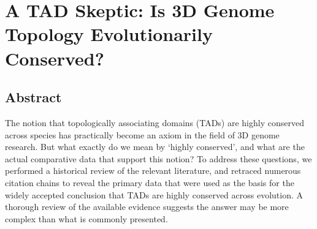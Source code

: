 \chapter{A TAD Skeptic: Is 3D Genome Topology Evolutionarily Conserved?}\label{ch:ch03}

\section[Abstract]{Abstract\footnotemark}

The notion that topologically associating domains (TADs) are highly conserved across species has practically become an axiom in the field of 3D genome research. But what exactly do we mean by `highly conserved', and what are the actual comparative data that support this notion? To address these questions, we performed a historical review of the relevant literature, and retraced numerous citation chains to reveal the primary data that were used as the basis for the widely accepted conclusion that TADs are highly conserved across evolution. A thorough review of the available evidence suggests the answer may be more complex than what is commonly presented.


